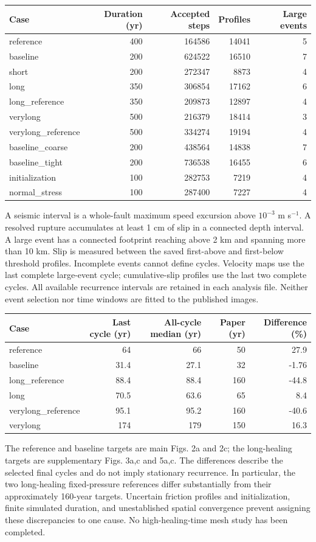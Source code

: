 \documentclass[11pt]{article}
\begin{document}
\begin{center}\small
\begin{tabular}{lrrrr}\toprule
Case & Duration (yr) & Accepted steps & Profiles & Large events\\\midrule
reference & 400 & 164586 & 14041 & 5\\
baseline & 200 & 624522 & 16510 & 7\\
short & 200 & 272347 & 8873 & 4\\
long & 350 & 306854 & 17162 & 6\\
long\_reference & 350 & 209873 & 12897 & 4\\
verylong & 500 & 216379 & 18414 & 3\\
verylong\_reference & 500 & 334274 & 19194 & 4\\
baseline\_coarse & 200 & 438564 & 14838 & 7\\
baseline\_tight & 200 & 736538 & 16455 & 6\\
initialization & 100 & 282753 & 7219 & 4\\
normal\_stress & 100 & 287400 & 7227 & 4\\
\bottomrule\end{tabular}\end{center}
A seismic interval is a whole-fault maximum speed excursion above
$10^{-3}$ m s$^{-1}$. A resolved rupture accumulates at least 1 cm of slip in a
connected depth interval. A large event has a connected footprint reaching above
2 km and spanning more than 10 km. Slip is measured between the saved first-above
and first-below threshold profiles. Incomplete events cannot define cycles.
Velocity maps use the last complete large-event cycle; cumulative-slip profiles
use the last two complete cycles. All available recurrence intervals are retained
in each analysis file. Neither event selection nor time windows are fitted to
the published images.

\begin{center}\small
\begin{tabular}{lrrrr}\toprule
Case & Last cycle (yr) & All-cycle median (yr) & Paper (yr) & Difference (\%)\\\midrule
reference & 64 & 66 & 50 & 27.9\\
baseline & 31.4 & 27.1 & 32 & -1.76\\
long\_reference & 88.4 & 88.4 & 160 & -44.8\\
long & 70.5 & 63.6 & 65 & 8.4\\
verylong\_reference & 95.1 & 95.2 & 160 & -40.6\\
verylong & 174 & 179 & 150 & 16.3\\
\bottomrule\end{tabular}\end{center}
The reference and baseline targets are main Figs. 2a and 2c; the long-healing targets are supplementary
Figs. 3a,c and 5a,c. The differences describe the selected final cycles and do not
imply stationary recurrence. In particular, the two long-healing fixed-pressure
references differ substantially from their approximately 160-year targets.
Uncertain friction profiles and initialization, finite simulated duration, and
unestablished spatial convergence prevent assigning these discrepancies to one
cause. No high-healing-time mesh study has been completed.
\end{document}
